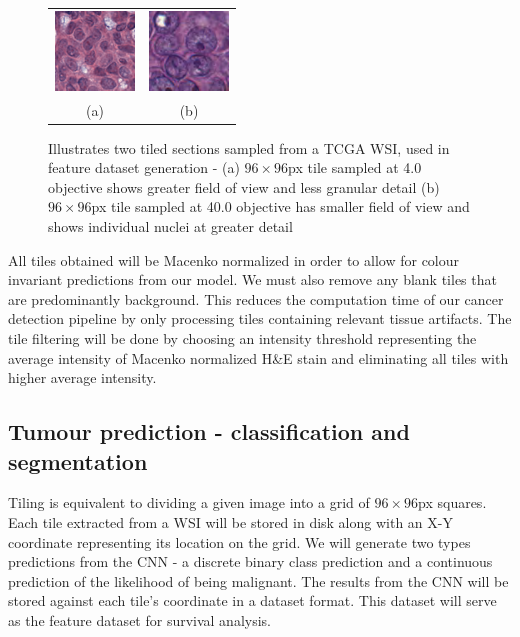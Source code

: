 \documentclass{l4proj}
\begin{document}
\begin{figure}[H]
\centering
\begin{tabular}{cc}
 \includegraphics[width=80px]{images/45_117.png}&
 \includegraphics[width=80px]{images/119_239.png}\\
 (a)&(b)\\
\end{tabular}
\caption{Illustrates two tiled sections sampled from a TCGA WSI, used in feature dataset generation - (a) \(96\times96\)px tile sampled at 4.0 objective shows greater field of view and less granular detail (b) \(96\times96\)px tile sampled at 40.0 objective has smaller field of view and shows individual nuclei at greater detail}
\label{fig:undersample-example}
\end{figure}

All tiles obtained will be Macenko normalized in order to allow for colour invariant predictions from our model. We must also remove any blank tiles that are predominantly background. This reduces the computation time of our cancer detection pipeline by only processing tiles containing relevant tissue artifacts. The tile filtering will be done by choosing an intensity threshold representing the average intensity of Macenko normalized H\&E stain and eliminating all tiles with higher average intensity. 

\subsection{Tumour prediction - classification and segmentation} \label{sec:classication-design}
Tiling is equivalent to dividing a given image into a grid of \(96 \times 96\)px squares. Each tile extracted from a WSI will be stored in disk along with an X-Y coordinate representing its location on the grid. We will generate two types predictions from the CNN - a discrete binary class prediction and a continuous prediction of the likelihood of being malignant. The results from the CNN will be stored against each tile's coordinate in a dataset format. This dataset will serve as the feature dataset for survival analysis. 
\end{document}
